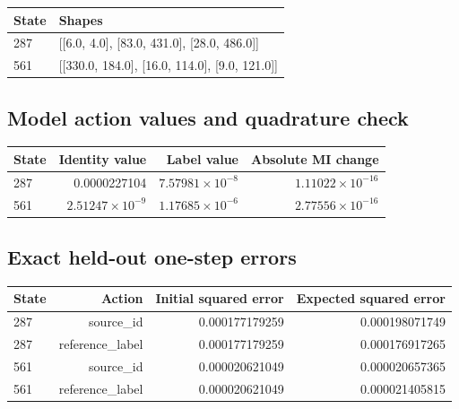 \begingroup\small
\setlength{\tabcolsep}{4pt}
\begin{longtable}{p{}p{}}
\toprule

State & Shapes\\\midrule\endhead

287 & [[6.0, 4.0], [83.0, 431.0], [28.0, 486.0]]\\

561 & [[330.0, 184.0], [16.0, 114.0], [9.0, 121.0]]\\

\bottomrule
\end{longtable}
\endgroup

\reservetable
\subsection{Model action values and quadrature check}

\begingroup\small
\setlength{\tabcolsep}{4pt}
\begin{longtable}{lrrr}
\toprule

State & Identity value & Label value & Absolute MI change\\\midrule\endhead

287 & 0.0000227104 & $7.57981\times10^{-8}$ & $1.11022\times10^{-16}$\\

561 & $2.51247\times10^{-9}$ & $1.17685\times10^{-6}$ & $2.77556\times10^{-16}$\\

\bottomrule
\end{longtable}
\endgroup

\reservetable
\subsection{Exact held-out one-step errors}

\begingroup\small
\setlength{\tabcolsep}{4pt}
\begin{longtable}{lrrr}
\toprule

State & Action & Initial squared error & Expected squared error\\\midrule\endhead

287 & source\_id & 0.000177179259 & 0.000198071749\\

287 & reference\_label & 0.000177179259 & 0.000176917265\\

561 & source\_id & 0.000020621049 & 0.000020657365\\

561 & reference\_label & 0.000020621049 & 0.000021405815\\

\bottomrule
\end{longtable}
\endgroup

